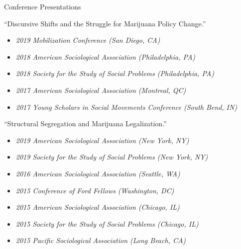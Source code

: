 \documentclass{resume} %
\begin{document}
\begin{rSection}{Conference Presentations}

``Discursive Shifts and the Struggle for Marijuana Policy Change.''
\vspace*{-.75em} 
\begin{itemize}[leftmargin=.25in]
\item {\footnotesize \it 2019 Mobilization Conference (San Diego, CA)}\vspace*{-.75em} 
\item {\footnotesize \it 2018 American Sociological Association (Philadelphia, PA)}\vspace*{-.75em} 
\item {\footnotesize \it 2018 Society for the Study of Social Problems (Philadelphia, PA)}\vspace*{-.75em} 
\item {\footnotesize \it 2017 American Sociological Association (Montreal, QC)}\vspace*{-.75em} 
\item {\footnotesize \it 2017 Young Scholars in Social Movements Conference (South Bend, IN)}
\end{itemize} 

``Structural Segregation and Marijuana Legalization.''
\vspace*{-.75em} 
\begin{itemize}[leftmargin=.25in] 
\item {\footnotesize \it 2019 American Sociological Association (New York, NY)}\vspace*{-.75em} 
\item {\footnotesize \it 2019 Society for the Study of Social Problems (New York, NY)}\vspace*{-.75em} 
\item {\footnotesize \it 2016 American Sociological Association (Seattle, WA)}\vspace*{-.75em} 
\item {\footnotesize \it 2015 Conference of Ford Fellows (Washington, DC)}\vspace*{-.75em} 
\item {\footnotesize \it 2015 American Sociological Association (Chicago, IL)}\vspace*{-.75em} 
\item {\footnotesize \it 2015 Society for the Study of Social Problems (Chicago, IL)}\vspace*{-.75em} 
\item {\footnotesize \it 2015 Pacific Sociological Association (Long Beach, CA)}
\end{itemize} 


\end{rSection}
\end{document}
